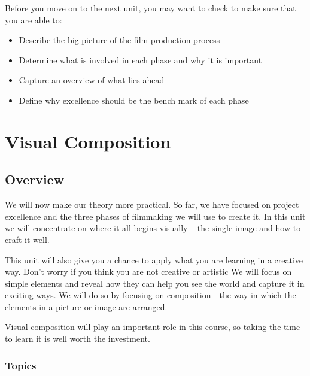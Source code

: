 \documentclass[
]{book}
\providecommand{\tightlist}{%
  \setlength{\itemsep}{0pt}\setlength{\parskip}{0pt}}
\begin{document}
\begin{progress}
Before you move on to the next unit, you may want to check to make sure that you are able to:

\begin{itemize}
\tightlist
\item
  Describe the big picture of the film production process\\
\item
  Determine what is involved in each phase and why it is important\\
\item
  Capture an overview of what lies ahead\\
\item
  Define why excellence should be the bench mark of each phase
\end{itemize}
\end{progress}

\hypertarget{visual-composition}{%
\chapter{Visual Composition}\label{visual-composition}}

\hypertarget{overview-2}{%
\section*{Overview}\label{overview-2}}

We will now make our theory more practical. So far, we have focused on project excellence and the three phases of filmmaking we will use to create it. In this unit we will concentrate on where it all begins visually -- the single image and how to craft it well.

This unit will also give you a chance to apply what you are learning in a creative way. Don't worry if you think you are not creative or artistic We will focus on simple elements and reveal how they can help you see the world and capture it in exciting ways. We will do so by focusing on composition---the way in which the elements in a picture or image are arranged.

Visual composition will play an important role in this course, so taking the time to learn it is well worth the investment.

\hypertarget{topics-2}{%
\subsection*{Topics}\label{topics-2}}
\end{document}
